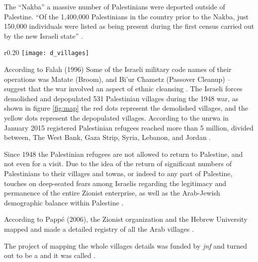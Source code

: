 The “Nakba” a massive number of Palestinians were deported outside of Palestine. “Of the
1,400,000 Palestinians in the country prior to the Nakba, just 150,000 individuals were listed
as being present during the first census carried out by the new Israeli state” \citep{Sanbar2007}.

\begin{wrapfigure}{r}{0.20\textwidth} %
    \centering
    \texttt{[image: d\_villages]}
    \caption{Demolished and depopulated villages - Palestine Open Maps, © 2018  Visualizing Palestine}
    \label{fig:map}
\end{wrapfigure}

According to Falah (1996) Some of the Israeli military code names of their operations was
Matate (Broom), and Bi’ur Chametz (Passover Cleanup) – suggest that the war involved an
aspect of ethnic cleansing \citep{Falah1996}\citep{Pappe2006}. The Israeli forces demolished and depopulated 531
Palestinian villages during the 1948 war, as shown in figure \ref{fig:map} the red dots represent the demolished villages, and the yellow dots represent the depopulated villages.  
According to the \acrshort{unrwa} in January 2015 registered
Palestinian refugees reached more than 5 million, divided between, The West Bank, Gaza
Strip, Syria, Lebanon, and Jordan \citep{Khalidi2015} \citep{DajaniDaoudi2011}. 

Since 1948 the Palestinian refugees are not allowed to return to Palestine, and not even for a visit. Due to the idea of the return of significant numbers of Palestinians to their villages and towns, or indeed to any part of Palestine, touches on deep-seated fears among Israelis regarding the legitimacy and permanence of the entire Zionist enterprise, as well as the Arab-Jewish demographic balance within Palestine \citep{Khalidi2016}.



According to Pappé (2006), the Zionist organization and the Hebrew University mapped and made a detailed registry of all the Arab villages \citep{Pappe2006}.



The project of mapping the whole villages details was funded by \textit{\acrfull{jnf}} and turned out to be a  and it was called \citep{Pappe2006}. 


